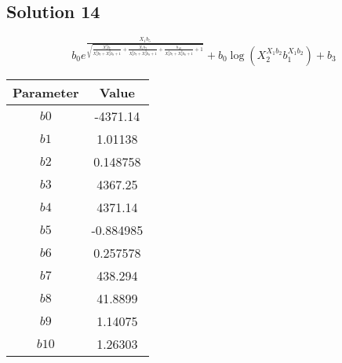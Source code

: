 \documentclass{article}
\begin{document}
\vspace{1em}
\subsection*{Solution 14}
\[
b_{0} e^{\frac{X_{1} b_{5}}{\sqrt{\frac{X_{1}^{2} b_{6}}{X_{2}^{4} b_{7} + X_{2}^{2} b_{8} + 1} + \frac{X_{1} b_{9}}{X_{2}^{4} b_{7} + X_{2}^{2} b_{8} + 1} + \frac{b_{10}}{X_{2}^{4} b_{7} + X_{2}^{2} b_{8} + 1} + 1}}} + b_{0} \log{\left(X_{2}^{X_{1} b_{2}} b_{1}^{X_{1} b_{2}} \right)} + b_{3}
\]
\begin{center}
\begin{tabular}{cc}
\toprule
Parameter & Value \\
\midrule
$b0$ & -4371.14 \\
$b1$ & 1.01138 \\
$b2$ & 0.148758 \\
$b3$ & 4367.25 \\
$b4$ & 4371.14 \\
$b5$ & -0.884985 \\
$b6$ & 0.257578 \\
$b7$ & 438.294 \\
$b8$ & 41.8899 \\
$b9$ & 1.14075 \\
$b10$ & 1.26303 \\
\bottomrule
\end{tabular}
\end{center}

\vspace{1em}
\end{document}
